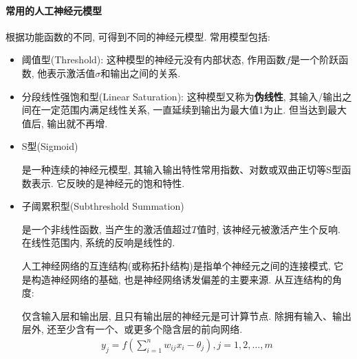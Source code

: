 \paragraph{常用的人工神经元模型}
根据功能函数的不同, 可得到不同的神经元模型. 常用模型包括:
\begin{itemize}
\item 阈值型(Threshold): 这种模型的神经元没有内部状态, 作用函数$f$是一个阶跃函数, 他表示激活值$\sigma$和输出之间的关系.
\item 分段线性强饱和型(Linear Saturation): 这种模型又称为\textbf{伪线性}, 其输入/输出之间在一定范围内满足线性关系, 一直延续到输出为最大值1为止. 但当达到最大值后, 输出就不再增.
\item S型(Sigmoid)

是一种连续的神经元模型, 其输入输出特性常用指数、对数或双曲正切等S型函数表示. 它反映的是神经元的饱和特性.

\item 子阈累积型(Subthreshold Summation)

是一个非线性函数, 当产生的激活值超过$T$值时, 该神经元被激活产生个反响. 在线性范围内, 系统的反响是线性的.

人工神经网络的互连结构(或称拓扑结构)是指单个神经元之间的连接模式, 它是构造神经网络的基础, 也是神经网络诱发偏差的主要来源. 从互连结构的角度:

仅含输入层和输出层, 且只有输出层的神经元是可计算节点. 除拥有输入、输出层外, 还至少含有一个、或更多个隐含层的前向网络.
\begin{align}
 {y}_{{j}}={f}\left(\sum_{{i}=1}^{{n}} w_{{ij}} {x}_{{i}}-\theta_{{j}}\right), {j}=1,2, \ldots, {m}
\end{align}
\end{itemize}
